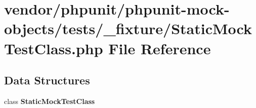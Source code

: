 \section{vendor/phpunit/phpunit-\/mock-\/objects/tests/\+\_\+fixture/\+Static\+Mock\+Test\+Class.php File Reference}
\label{_static_mock_test_class_8php}
\subsection*{Data Structures}
\begin{DoxyCompactItemize}
\item 
class {\bf Static\+Mock\+Test\+Class}
\end{DoxyCompactItemize}
